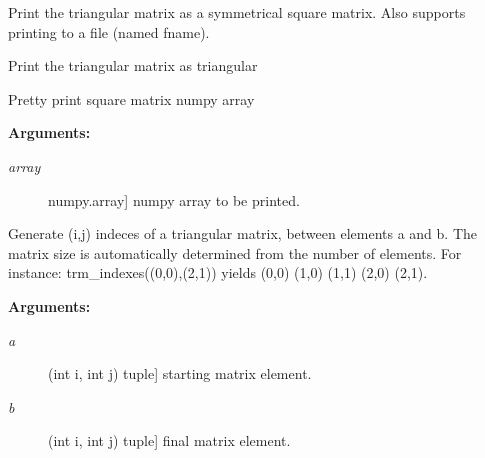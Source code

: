\documentclass[letterpaper,10pt,english]{sphinxmanual}
\begin{document}
\begin{fulllineitems}
\begin{fulllineitems}
\label{index:encore.utils.TriangularMatrix.square_print}
Print the triangular matrix as a symmetrical square matrix.
Also supports printing to a file (named fname).

\end{fulllineitems}


\begin{fulllineitems}
\label{index:encore.utils.TriangularMatrix.trm_print}
Print the triangular matrix as triangular

\end{fulllineitems}


\end{fulllineitems}


\begin{fulllineitems}
\label{index:encore.utils.print_square_array}
Pretty print square matrix numpy array

\textbf{Arguments:}
\begin{description}
\item[{\emph{array}}] \leavevmode{[}numpy.array{]}
numpy array to be printed.

\end{description}

\end{fulllineitems}


\begin{fulllineitems}
\label{index:encore.utils.trm_indeces}
Generate (i,j) indeces of a triangular matrix, between elements a and b. The matrix size is automatically determined from the number of elements.
For instance: trm\_indexes((0,0),(2,1)) yields (0,0) (1,0) (1,1) (2,0) (2,1).

\textbf{Arguments:}
\begin{description}
\item[{\emph{a}}] \leavevmode{[}(int i, int j) tuple{]}
starting matrix element.

\item[{\emph{b}}] \leavevmode{[}(int i, int j) tuple{]}
final matrix element.

\end{description}

\end{fulllineitems}
\end{document}
